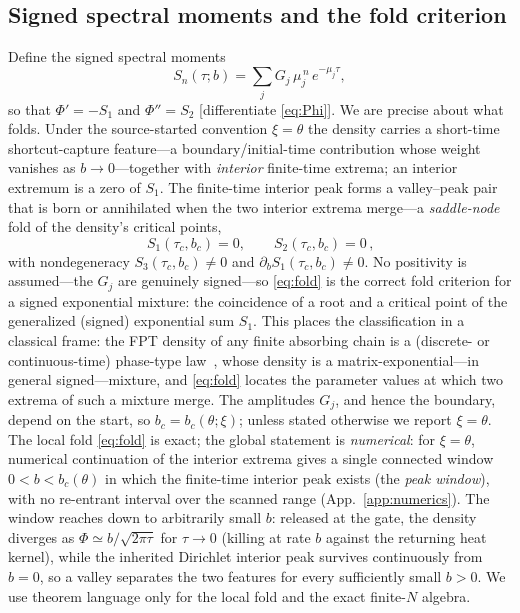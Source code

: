 \documentclass[reprint,amsmath,amssymb,aps,prresearch,longbibliography]{revtex4-2}
\begin{document}
\subsection{Signed spectral moments and the fold criterion}\label{sec:existA}
Define the signed spectral moments
\begin{equation}
S_n(\tau;b)=\sum_j G_j\,\mu_j^{\,n}\,e^{-\mu_j\tau},
\label{eq:Sn}
\end{equation}
so that $\Phi'=-S_1$ and $\Phi''=S_2$ [differentiate \eqref{eq:Phi}]. We are precise about what folds.
Under the source-started convention $\xi=\theta$ the density carries a short-time shortcut-capture
feature---a boundary/initial-time contribution whose weight vanishes as $b\to0$---together with \emph{interior}
finite-time extrema; an interior extremum is a zero of $S_1$. The finite-time interior peak
forms a valley--peak pair that is born or annihilated when the two interior extrema merge---a
\emph{saddle-node} fold of the density's critical points,
\begin{equation}
\boxed{\,S_1(\tau_c,b_c)=0,\qquad S_2(\tau_c,b_c)=0\,},
\label{eq:fold}
\end{equation}
with nondegeneracy $S_3(\tau_c,b_c)\neq0$ and $\partial_b S_1(\tau_c,b_c)\neq0$. No positivity is
assumed---the $G_j$ are genuinely signed---so \eqref{eq:fold} is the correct fold criterion for a
signed exponential mixture: the coincidence of a root and a critical point of the generalized (signed)
exponential sum $S_1$. This places the classification in a classical frame: the FPT density of any
finite absorbing chain is a (discrete- or continuous-time) phase-type law~\cite{Neuts1981}, whose
density is a matrix-exponential---in general signed---mixture, and \eqref{eq:fold} locates the
parameter values at which two extrema of
such a mixture merge. The amplitudes $G_j$, and hence the boundary, depend on the start, so
$b_c=b_c(\theta;\xi)$; unless stated otherwise we report $\xi=\theta$. The local fold \eqref{eq:fold} is
exact; the global statement is \emph{numerical}: for $\xi=\theta$, numerical continuation of the
interior extrema gives a single connected window $0<b<b_c(\theta)$ in which the finite-time interior
peak exists (the \emph{peak window}), with no re-entrant interval
over the scanned range (App.~\ref{app:numerics}). The window reaches down to arbitrarily small $b$:
released at the gate, the density diverges as $\Phi\simeq b/\sqrt{2\pi\tau}$ for $\tau\to0$ (killing at
rate $b$ against the returning heat kernel), while the inherited Dirichlet interior peak survives
continuously from $b=0$, so a valley separates the two features for every sufficiently small $b>0$. We
use theorem language only for the local fold and the exact finite-$N$ algebra.
\end{document}
